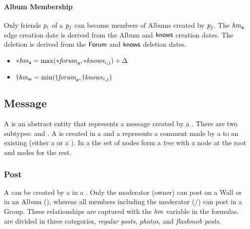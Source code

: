 \paragraph{Album Membership}
Only friends $\mathit{p}_i$ of a \tPerson $\mathit{p}_j$ can become members of Albums created by $\mathit{p}_j$. The \tHasMember $\mathit{hm}_{\mathsf{a}}$ edge creation date is derived from the Album and $\textsf{knows}$ creation dates. The deletion is derived from the $\textsf{Forum}$ and $\textsf{knows}$ deletion dates.
\begin{itemize}
    \item ${\ast}\mathit{\mathit{hm}}_\textsf{a} = \max ( {\ast}\mathit{\mathit{forum}}_\textsf{a}, {\ast}\mathit{\mathit{knows}}_{i,j} ) + \Delta $ %
    \item ${\dagger}\mathit{\mathit{hm}}_{\mathsf{w}} = \min ( {\dagger}\mathit{\mathit{forum}}_\textsf{a}, {\dagger}\mathit{\mathit{knows}}_{i,j} ) $ %
\end{itemize}

\subsection{Message}
\label{sec:message}

A \tMessage is an abstract entity that represents a message created by a \tPerson.
There are two \tMessage subtypes: \tPost and \tComment.
A \tPost is created in a \tForum and a \tComment represents a comment made by a \tPerson to an existing \tMessage (either a \tPost or a \tComment).
In a \tForum the set of \tMessage nodes form a \emph{tree} with a \tPost node at the root and \tComment nodes for the rest.

\subsubsection{Post}

A \tPost can be created by a \tPerson in a \tForum.
Only the moderator (\ie owner) can post on a Wall or in an Album (\tHasModerator),
whereas all members including the moderator (\tHasMember/\tHasModerator) can post in a Group.
These relationships are captured with the $\mathit{hm}$ variable in the formulas.
\tPosts are divided in three categories, \emph{regular posts}, \emph{photos}, and \emph{flashmob posts}.

